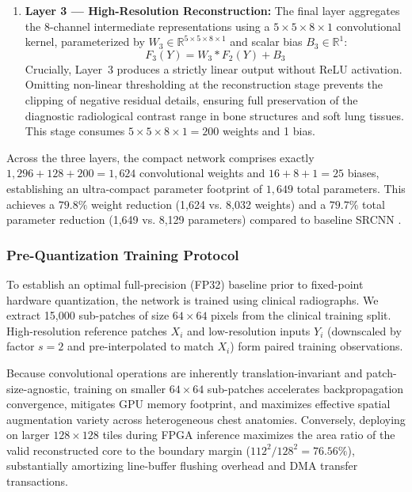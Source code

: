 \documentclass[conference]{IEEEtran}
\begin{document}
\begin{enumerate}
    \item \textbf{Layer 3 --- High-Resolution Reconstruction:} The final layer aggregates the 8-channel intermediate representations using a $5 \times 5 \times 8 \times 1$ convolutional kernel, parameterized by $W_3 \in \mathbb{R}^{5 \times 5 \times 8 \times 1}$ and scalar bias $B_3 \in \mathbb{R}^{1}$:
    \begin{equation}
    F_3(Y) = W_3 * F_2(Y) + B_3
    \label{eq:layer3_conv}
    \end{equation}
    Crucially, Layer~3 produces a strictly linear output without ReLU activation. Omitting non-linear thresholding at the reconstruction stage prevents the clipping of negative residual details, ensuring full preservation of the diagnostic radiological contrast range in bone structures and soft lung tissues. This stage consumes $5 \times 5 \times 8 \times 1 = 200$ weights and 1 bias.
\end{enumerate}

Across the three layers, the compact network comprises exactly $1,296 + 128 + 200 = 1,624$ convolutional weights and $16 + 8 + 1 = 25$ biases, establishing an ultra-compact parameter footprint of $1,649$ total parameters. This achieves a $79.8\%$ weight reduction (1,624 vs. 8,032 weights) and a $79.7\%$ total parameter reduction (1,649 vs. 8,129 parameters) compared to baseline SRCNN \cite{dong2014learning}.

\subsubsection{Pre-Quantization Training Protocol}
To establish an optimal full-precision (FP32) baseline prior to fixed-point hardware quantization, the network is trained using clinical radiographs. We extract 15,000 sub-patches of size $64 \times 64$ pixels from the clinical training split. High-resolution reference patches $X_i$ and low-resolution inputs $Y_i$ (downscaled by factor $s = 2$ and pre-interpolated to match $X_i$) form paired training observations.

Because convolutional operations are inherently translation-invariant and patch-size-agnostic, training on smaller $64 \times 64$ sub-patches accelerates backpropagation convergence, mitigates GPU memory footprint, and maximizes effective spatial augmentation variety across heterogeneous chest anatomies. Conversely, deploying on larger $128 \times 128$ tiles during FPGA inference maximizes the area ratio of the valid reconstructed core to the boundary margin ($112^2 / 128^2 = 76.56\%$), substantially amortizing line-buffer flushing overhead and DMA transfer transactions.
\end{document}
